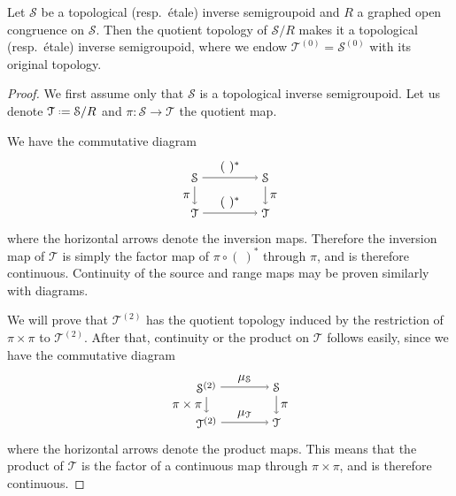 \begin{proposition}\label{prop:equivalecesetalequotient}
Let $\mathcal{S}$ be a topological (resp.\ étale) inverse semigroupoid and $R$ a graphed open congruence on $\mathcal{S}$. Then the quotient topology of $\mathcal{S}/R$ makes it a topological (resp.\ étale) inverse semigroupoid, where we endow $\mathcal{T}^{(0)}=\mathcal{S}^{(0)}$ with its original topology.
\end{proposition}
\begin{proof}
    We first assume only that $\mathcal{S}$ is a topological inverse semigroupoid. Let us denote $\mathcal{T}\defeq\mathcal{S}/R$ and $\pi\colon\mathcal{S}\to\mathcal{T}$ the quotient map.
    
    We have the commutative diagram
    \[\begin{tikzpicture}
    \node (S1) at (0,0) {$\mathcal{S}$};
    \node (S2) at ([shift={+(2,0)}]S1) {$\mathcal{S}$};
    \node (T1) at ([shift={+(0,-1)}]S1) {$\mathcal{T}$};
    \node (T2) at ([shift={+(2,0)}]T1) {$\mathcal{T}$};
    \draw[->] (S1)--(S2) node[midway,above] {$(\ )^*$};
    \draw[->] (S1)--(T1) node[midway,left] {$\pi$};
    \draw[->] (S2)--(T2) node[midway,right] {$\pi$};
    \draw[->] (T1)--(T2) node[midway,above] {$(\ )^*$};
    \end{tikzpicture}
    \]
    where the horizontal arrows denote the inversion maps. Therefore the inversion map of $\mathcal{T}$ is simply the factor map of $\pi\circ(\ )^*$ through $\pi$, and is therefore continuous. Continuity of the source and range maps may be proven similarly with diagrams.
    
    We will prove that $\mathcal{T}^{(2)}$ has the quotient topology induced by the restriction of $\pi\times\pi$ to $\mathcal{T}^{(2)}$. After that, continuity or the product on $\mathcal{T}$ follows easily, since we have the commutative diagram
    \[\begin{tikzpicture}
    \node (S2) at (0,0) {$\mathcal{S}^{(2)}$};
    \node (S) at ([shift={+(2,0)}]S2) {$\mathcal{S}$};
    \node (T2) at ([shift={+(0,-1)}]S2) {$\mathcal{T}^{(2)}$};
    \node (T) at ([shift={+(2,0)}]T2) {$\mathcal{T}$};
    \draw[->] (S2)--(S) node[midway,above] {$\mu_{\mathcal{S}}$};
    \draw[->] (S2)--(T2) node[midway,left] {$\pi\times\pi$};
    \draw[->] (S)--(T) node[midway,right] {$\pi$};
    \draw[->] (T2)--(T) node[midway,above] {$\mu_{\mathcal{T}}$};
    \end{tikzpicture}
    \]
    where the horizontal arrows denote the product maps. This means that the product of $\mathcal{T}$ is the factor of a continuous map through $\pi\times\pi$, and is therefore continuous.
    

\end{proof}
